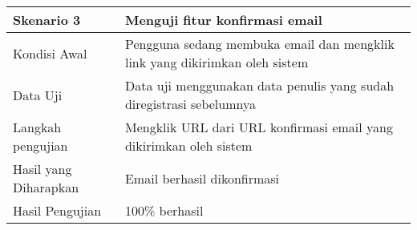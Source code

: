 \begin{longtable}{|X|X|}
		
	\textbf{Skenario 3}
		& Menguji fitur konfirmasi email \\ \hline
	Kondisi Awal
		& Pengguna sedang membuka email dan mengklik link yang dikirimkan oleh sistem \\ \hline
	Data Uji
		& Data uji menggunakan data penulis yang sudah diregistrasi sebelumnya \\ \hline
	Langkah pengujian &
		Mengklik URL dari URL konfirmasi email yang dikirimkan oleh sistem \\ \hline
	Hasil yang Diharapkan
		& Email berhasil dikonfirmasi \\ \hline
	Hasil Pengujian
		& 100\% berhasil \\ \hline	
\end{longtable}
